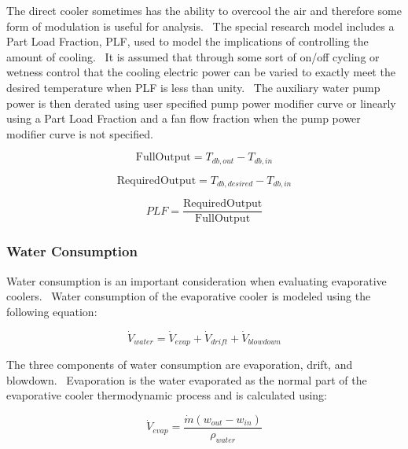 The direct cooler sometimes has the ability to overcool the air and therefore some form of modulation is useful for analysis.~ The special research model includes a Part Load Fraction, PLF, used to model the implications of controlling the amount of cooling.~ It is assumed that through some sort of on/off cycling or wetness control that the cooling electric power can be varied to exactly meet the desired temperature when PLF is less than unity.~ The auxiliary water pump power is then derated using user specified pump power modifier curve or linearly using a Part Load Fraction and a fan flow fraction when the pump power modifier curve is not specified.

\begin{equation}
{\mathrm{FullOutput}} = {T_{db,out}} - {T_{db,in}}
\label{eq:IECFullOutput}
\end{equation}

\begin{equation}
{\mathrm{RequiredOutput}} = {T_{db,desired}} - {T_{db,in}}
\label{eq:IECRequiredOutput}
\end{equation}

\begin{equation}
PLF = \frac{{{\mathrm{RequiredOutput}}}}{{{\mathrm{FullOutput}}}}
\label{eq:IECPLF}
\end{equation}


\subsubsection{Water Consumption}\label{water-consumption-1}

Water consumption is an important consideration when evaluating evaporative coolers.~ Water consumption of the evaporative cooler is modeled using the following equation:

\begin{equation}
{\dot V_{water}} = {\dot V_{evap}} + {\dot V_{drift}} + {\dot V_{blowdown}}
\end{equation}

The three components of water consumption are evaporation, drift, and blowdown.~ Evaporation is the water evaporated as the normal part of the evaporative cooler thermodynamic process and is calculated using:

\begin{equation}
{\dot V_{evap}} = \frac{{\dot m\left( {{w_{out}} - {w_{in}}} \right)}}{{{\rho_{water}}}}
\end{equation}


